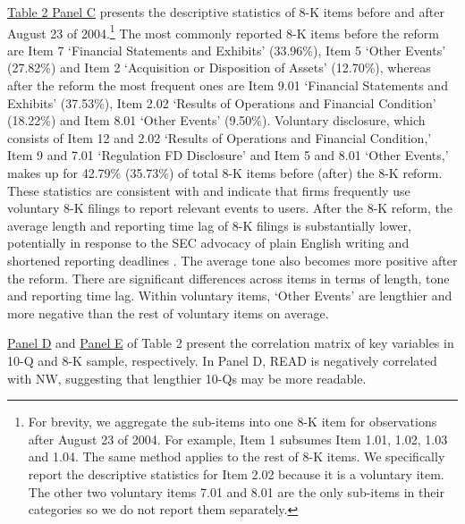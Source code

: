 \documentclass[letterpaper,12pt]{article}
\begin{document}
\begin{spacing}{1.5}
\hyperref[T2PC]{Table 2 Panel C} presents the descriptive statistics of 8-K items before and after August 23 of 2004.\footnote{For brevity, we aggregate the sub-items into one 8-K item for observations after August 23 of 2004. For example, Item 1 subsumes Item 1.01, 1.02, 1.03 and 1.04. The same method applies to the rest of 8-K items. We specifically report the descriptive statistics for Item 2.02 because it is a voluntary item. The other two voluntary items 7.01 and 8.01 are the only sub-items in their categories so we do not report them separately.} The most commonly reported 8-K items before the reform are Item 7 `Financial Statements and Exhibits' (33.96\%), Item 5 `Other Events' (27.82\%) and Item 2 `Acquisition or Disposition of Assets' (12.70\%), whereas after the reform the most frequent ones are Item 9.01 `Financial Statements and Exhibits' (37.53\%), Item 2.02 `Results of Operations and Financial Condition' (18.22\%) and Item 8.01 `Other Events' (9.50\%). Voluntary disclosure, which consists of Item 12 and 2.02 `Results of Operations and Financial Condition,' Item 9 and 7.01 `Regulation FD Disclosure' and Item 5 and 8.01 `Other Events,' makes up for 42.79\% (35.73\%) of total 8-K items before (after) the 8-K reform. These statistics are consistent with  and indicate that firms frequently use voluntary 8-K filings to report relevant events to users. After the 8-K reform, the average length and reporting time lag of 8-K filings is substantially lower, potentially in response to the SEC advocacy of plain English writing \cite{secDivisionCorporateFinance1999} and shortened reporting deadlines \cite{secFinalRuleAdditional2004}. The average tone also becomes more positive after the reform. There are significant differences across items in terms of length, tone and reporting time lag. Within voluntary items, `Other Events' are lengthier and more negative than the rest of voluntary items on average.

\hyperref[T2PD]{Panel D} and \hyperref[T2PE]{Panel E} of Table 2 present the correlation matrix of key variables in 10-Q and 8-K sample, respectively. In Panel D, READ is negatively correlated with NW, suggesting that lengthier 10-Qs may be more readable.


\end{spacing}
\end{document}
